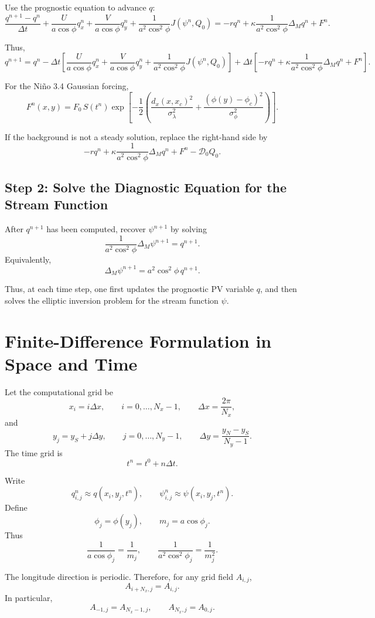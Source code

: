 \documentclass[11pt]{article}
\begin{document}
Use the prognostic equation to advance \(q\):
\[
\boxed{
\frac{q^{n+1}-q^n}{\Delta t}
+
\frac{U}{a\cos\phi}q_x^n
+
\frac{V}{a\cos\phi}q_y^n
+
\frac{1}{a^2\cos^2\phi}
J(\psi^n,Q_0)
=
-rq^n
+
\kappa
\frac{1}{a^2\cos^2\phi}
\Delta_M q^n
+
F^n .
}
\]

Thus,
\[
\boxed{
q^{n+1}
=
q^n
-\Delta t
\left[
\frac{U}{a\cos\phi}q_x^n
+
\frac{V}{a\cos\phi}q_y^n
+
\frac{1}{a^2\cos^2\phi}
J(\psi^n,Q_0)
\right]
+
\Delta t
\left[
-rq^n
+
\kappa
\frac{1}{a^2\cos^2\phi}
\Delta_M q^n
+
F^n
\right].
}
\]

For the Ni\~no 3.4 Gaussian forcing,
\[
\boxed{
F^n(x,y)
=
F_0\,S(t^n)
\exp
\left[
-\frac{1}{2}
\left(
\frac{d_x(x,x_c)^2}{\sigma_\lambda^2}
+
\frac{(\phi(y)-\phi_c)^2}{\sigma_\phi^2}
\right)
\right].
}
\]

If the background is not a steady solution, replace the right-hand side by
\[
-rq^n
+
\kappa
\frac{1}{a^2\cos^2\phi}
\Delta_M q^n
+
F^n
-
\mathcal D_0 Q_0 .
\]

\subsection{Step 2: Solve the Diagnostic Equation for the Stream Function}

After \(q^{n+1}\) has been computed, recover \(\psi^{n+1}\) by solving
\[
\boxed{
\frac{1}{a^2\cos^2\phi}\Delta_M\psi^{n+1}=q^{n+1}.
}
\]
Equivalently,
\[
\boxed{
\Delta_M\psi^{n+1}
=
a^2\cos^2\phi\,q^{n+1}.
}
\]

Thus, at each time step, one first updates the prognostic PV variable \(q\), and
then solves the elliptic inversion problem for the stream function \(\psi\).

\section{Finite-Difference Formulation in Space and Time}

Let the computational grid be
\[
x_i=i\Delta x,
\qquad
i=0,\ldots,N_x-1,
\qquad
\Delta x=\frac{2\pi}{N_x},
\]
and
\[
y_j=y_S+j\Delta y,
\qquad
j=0,\ldots,N_y-1,
\qquad
\Delta y=\frac{y_N-y_S}{N_y-1}.
\]
The time grid is
\[
t^n=t^0+n\Delta t .
\]

Write
\[
q_{i,j}^n \approx q(x_i,y_j,t^n),
\qquad
\psi_{i,j}^n \approx \psi(x_i,y_j,t^n).
\]
Define
\[
\phi_j=\phi(y_j),
\qquad
m_j=a\cos\phi_j .
\]
Thus
\[
\frac{1}{a\cos\phi_j}=\frac{1}{m_j},
\qquad
\frac{1}{a^2\cos^2\phi_j}=\frac{1}{m_j^2}.
\]

The longitude direction is periodic. Therefore, for any grid field \(A_{i,j}\),
\[
A_{i+N_x,j}=A_{i,j}.
\]
In particular,
\[
A_{-1,j}=A_{N_x-1,j},
\qquad
A_{N_x,j}=A_{0,j}.
\]
\end{document}
